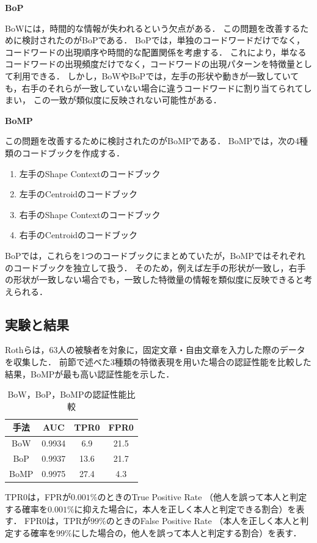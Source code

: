 \documentclass[twoside,twocolumn]{ujarticle}
\begin{document}
\vspace{0.2cm}
\noindent \textbf{BoP}

BoWには，時間的な情報が失われるという欠点がある．
この問題を改善するために検討されたのがBoPである．
BoPでは，単独のコードワードだけでなく，コードワードの出現順序や時間的な配置関係を考慮する．
これにより，単なるコードワードの出現頻度だけでなく，コードワードの出現パターンを特徴量として利用できる．
しかし，BoWやBoPでは，左手の形状や動きが一致していても，右手のそれらが一致していない場合に違うコードワードに割り当てられてしまい，
この一致が類似度に反映されない可能性がある．

\vspace{0.2cm}
\noindent \textbf{BoMP}

この問題を改善するために検討されたのがBoMPである．
BoMPでは，次の4種類のコードブックを作成する．
\begin{enumerate}
  \setlength{\parskip}{0cm}
  \setlength{\itemsep}{0cm}
  \item 左手のShape Contextのコードブック
  \item 左手のCentroidのコードブック
  \item 右手のShape Contextのコードブック
  \item 右手のCentroidのコードブック
\end{enumerate}
BoPでは，これらを1つのコードブックにまとめていたが，BoMPではそれぞれのコードブックを独立して扱う．
そのため，例えば左手の形状が一致し，右手の形状が一致しない場合でも，一致した特徴量の情報を類似度に反映できると考えられる．

\subsection{実験と結果}

Rothらは，63人の被験者を対象に，固定文章・自由文章を入力した際のデータを収集した．
前節で述べた3種類の特徴表現を用いた場合の認証性能を比較した結果，BoMPが最も高い認証性能を示した．
\begin{table}[htbp]
  \centering
  \caption{BoW，BoP，BoMPの認証性能比較}
  \label{tab:BoW_BoP_BoMP}
  \begin{tabular}{c|ccc}
    \hline \hline
    手法 & AUC & TPR0 & FPR0 \\
    \hline
    BoW  & 0.9934 & 6.9 & 21.5 \\
    BoP  & 0.9937 & 13.6 & 21.7 \\
    BoMP & 0.9975 & 27.4 & 4.3 \\
    \hline \hline
  \end{tabular}
\end{table}
TPR0は，FPRが$0.001\%$のときのTrue Positive Rate
（他人を誤って本人と判定する確率を$0.001\%$に抑えた場合に，本人を正しく本人と判定できる割合）を表す．
FPR0は，TPRが$99\%$のときのFalse Positive Rate
（本人を正しく本人と判定する確率を$99\%$にした場合の，他人を誤って本人と判定する割合）を表す．
\end{document}
